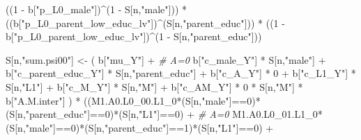 \documentclass[
]{book}
\newenvironment{Shaded}{\begin{snugshade}}{\end{snugshade}}
\newcommand{\CommentTok}[1]{\textcolor[rgb]{0.56,0.35,0.01}{\textit{#1}}}
\newcommand{\DecValTok}[1]{\textcolor[rgb]{0.00,0.00,0.81}{#1}}
\newcommand{\NormalTok}[1]{#1}
\newcommand{\OtherTok}[1]{\textcolor[rgb]{0.56,0.35,0.01}{#1}}
\newcommand{\SpecialCharTok}[1]{\textcolor[rgb]{0.00,0.00,0.00}{#1}}
\newcommand{\StringTok}[1]{\textcolor[rgb]{0.31,0.60,0.02}{#1}}
\begin{document}
\begin{Shaded}
\begin{Highlighting}[]
\NormalTok{      ((}\DecValTok{1} \SpecialCharTok{{-}}\NormalTok{ b[}\StringTok{"p\_L0\_male"}\NormalTok{])}\SpecialCharTok{\^{}}\NormalTok{(}\DecValTok{1} \SpecialCharTok{{-}}\NormalTok{ S[n,}\StringTok{"male"}\NormalTok{])) }\SpecialCharTok{*} 
\NormalTok{      ((b[}\StringTok{"p\_L0\_parent\_low\_educ\_lv"}\NormalTok{])}\SpecialCharTok{\^{}}\NormalTok{(S[n,}\StringTok{"parent\_educ"}\NormalTok{])) }\SpecialCharTok{*}
\NormalTok{      ((}\DecValTok{1} \SpecialCharTok{{-}}\NormalTok{ b[}\StringTok{"p\_L0\_parent\_low\_educ\_lv"}\NormalTok{])}\SpecialCharTok{\^{}}\NormalTok{(}\DecValTok{1} \SpecialCharTok{{-}}\NormalTok{ S[n,}\StringTok{"parent\_educ"}\NormalTok{])) }
    
\NormalTok{    S[n,}\StringTok{"sum.psi00"}\NormalTok{] }\OtherTok{\textless{}{-}}\NormalTok{  ( b[}\StringTok{"mu\_Y"}\NormalTok{] }\SpecialCharTok{+}                                          \CommentTok{\# A=0}
\NormalTok{                             b[}\StringTok{"c\_male\_Y"}\NormalTok{] }\SpecialCharTok{*}\NormalTok{ S[n,}\StringTok{"male"}\NormalTok{] }\SpecialCharTok{+} 
\NormalTok{                             b[}\StringTok{"c\_parent\_educ\_Y"}\NormalTok{] }\SpecialCharTok{*}\NormalTok{ S[n,}\StringTok{"parent\_educ"}\NormalTok{] }\SpecialCharTok{+} 
\NormalTok{                             b[}\StringTok{"c\_A\_Y"}\NormalTok{] }\SpecialCharTok{*} \DecValTok{0} \SpecialCharTok{+} 
\NormalTok{                             b[}\StringTok{"c\_L1\_Y"}\NormalTok{] }\SpecialCharTok{*}\NormalTok{ S[n,}\StringTok{"L1"}\NormalTok{] }\SpecialCharTok{+}
\NormalTok{                             b[}\StringTok{"c\_M\_Y"}\NormalTok{] }\SpecialCharTok{*}\NormalTok{ S[n,}\StringTok{"M"}\NormalTok{] }\SpecialCharTok{+}
\NormalTok{                             b[}\StringTok{"c\_AM\_Y"}\NormalTok{] }\SpecialCharTok{*} \DecValTok{0} \SpecialCharTok{*}\NormalTok{ S[n,}\StringTok{"M"}\NormalTok{] }\SpecialCharTok{*}\NormalTok{ b[}\StringTok{"A.M.inter"}\NormalTok{] ) }\SpecialCharTok{*}
\NormalTok{      ((M1.A0.L0\_00.L1\_0}\SpecialCharTok{*}\NormalTok{(S[n,}\StringTok{"male"}\NormalTok{]}\SpecialCharTok{==}\DecValTok{0}\NormalTok{)}\SpecialCharTok{*}\NormalTok{(S[n,}\StringTok{"parent\_educ"}\NormalTok{]}\SpecialCharTok{==}\DecValTok{0}\NormalTok{)}\SpecialCharTok{*}\NormalTok{(S[n,}\StringTok{"L1"}\NormalTok{]}\SpecialCharTok{==}\DecValTok{0}\NormalTok{) }\SpecialCharTok{+} \CommentTok{\# A\textquotesingle{}=0}
\NormalTok{          M1.A0.L0\_01.L1\_0}\SpecialCharTok{*}\NormalTok{(S[n,}\StringTok{"male"}\NormalTok{]}\SpecialCharTok{==}\DecValTok{0}\NormalTok{)}\SpecialCharTok{*}\NormalTok{(S[n,}\StringTok{"parent\_educ"}\NormalTok{]}\SpecialCharTok{==}\DecValTok{1}\NormalTok{)}\SpecialCharTok{*}\NormalTok{(S[n,}\StringTok{"L1"}\NormalTok{]}\SpecialCharTok{==}\DecValTok{0}\NormalTok{) }\SpecialCharTok{+}

\end{Highlighting}
\end{Shaded}
\end{document}
